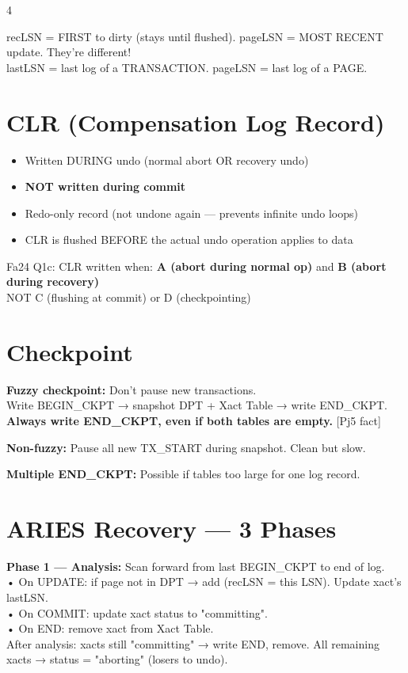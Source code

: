 \documentclass[8pt,letterpaper]{article}
\newcommand{\key}[1]{\textbf{\color{red!70!black}#1}}
\newcommand{\ans}[1]{\textbf{\color{blue!80!black}#1}}
\newcommand{\warn}[1]{\textbf{\color{orange!85!black}#1}}
\newcommand{\qref}[1]{{\fontsize{3.5}{4}\selectfont\color{purple!60!black}[#1]}}
\begin{document}
\begin{multicols*}{4}
\begin{warnbox}
recLSN = FIRST to dirty (stays until flushed). pageLSN = MOST RECENT update. They're different!\\
lastLSN = last log of a TRANSACTION. pageLSN = last log of a PAGE.
\end{warnbox}

\section{CLR (Compensation Log Record)}
\begin{itemize}
  \item Written DURING undo (normal abort OR recovery undo)
  \item \warn{NOT written during commit}
  \item Redo-only record (not undone again — prevents infinite undo loops)
  \item CLR is flushed BEFORE the actual undo operation applies to data
\end{itemize}

\begin{ansbox}
Fa24 Q1c: CLR written when: \ans{A (abort during normal op)} and \ans{B (abort during recovery)}\\
NOT C (flushing at commit) or D (checkpointing)
\end{ansbox}

\section{Checkpoint}
\key{Fuzzy checkpoint:} Don't pause new transactions.\\
Write BEGIN\_CKPT → snapshot DPT + Xact Table → write END\_CKPT.\\
\warn{Always write END\_CKPT, even if both tables are empty.} \qref{Pj5 fact}

\key{Non-fuzzy:} Pause all new TX\_START during snapshot. Clean but slow.

\key{Multiple END\_CKPT:} Possible if tables too large for one log record.

\section{ARIES Recovery — 3 Phases}

\begin{greenbox}
\textbf{Phase 1 — Analysis:} Scan forward from last BEGIN\_CKPT to end of log.\\
• On UPDATE: if page not in DPT → add (recLSN = this LSN). Update xact's lastLSN.\\
• On COMMIT: update xact status to "committing".\\
• On END: remove xact from Xact Table.\\
After analysis: xacts still "committing" → write END, remove. All remaining xacts → status = "aborting" (losers to undo).
\end{greenbox}


\end{multicols*}
\end{document}
